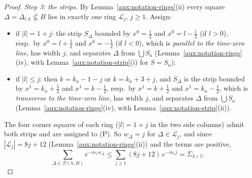 \begin{proof}
\emph{Step 3: the strips.}  By Lemma~\ref{aux:notation-rings}(ii) every square
$\Delta=\Delta_{l,k}\not\subseteq B$ lies in exactly one ring $\mathcal L_j$, $j\ge1$.  Assign:
\begin{itemize}
\item[(P)] if $|l|=1+j$: the strip $S_\Delta$ bounded by $x^0=\frac12$ and $x^0=l-\frac12$ (if
$l>0$), resp.\ by $x^0=l+\frac12$ and $x^0=-\frac12$ (if $l<0$), which is \emph{parallel to the
time-zero line}, has width $j$, and separates $\Delta$ from $\bigcup S_a$
(Lemma~\ref{aux:notation-rings}(iv), with Lemma~\ref{aux:notation-strip}(i) for $S=S_a$);
\item[(T)] if $|l|\le j$: then $k=k_a-1-j$ or $k=k_a+3+j$, and $S_\Delta$ is the strip bounded by
$x^1=k_a+\frac52$ and $x^1=k-\frac12$, resp.\ by $x^1=k+\frac12$ and $x^1=k_a-\frac12$, which is
\emph{transverse to the time-zero line}, has width $j$, and separates $\Delta$ from $\bigcup S_a$
(Lemma~\ref{aux:notation-rings}(iv), with Lemma~\ref{aux:notation-strip}(ii)).
\end{itemize}
The four corner squares of each ring ($|l|=1+j$ in the two side columns) admit both strips and are
assigned to (P).  So $w_\Delta=j$ for $\Delta\in\mathcal L_j$, and since $|\mathcal L_j|=8j+12$
(Lemma~\ref{aux:notation-rings}(ii)) and the terms are positive,
\[
 \sum_{\Delta\in\mathcal D(h,B)}e^{-m_1w_\Delta}\le\sum_{j\ge1}(8j+12)\,e^{-m_1j}
 =\overline\Sigma_{3\times5} .
\]


\end{proof}
